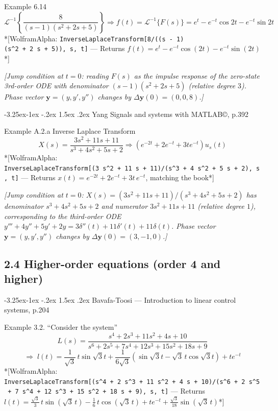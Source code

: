 \documentclass[
  11pt,
]{article}
\makeatletter
\providecommand{\implies}{\Longrightarrow}
\renewcommand\paragraph{\@startsection{paragraph}{4}{\z@}%
                                     {-3.25ex\@plus -1ex \@minus -.2ex}%
                                     {1.5ex \@plus .2ex}%
                                     {\normalfont\normalsize\bfseries}}
\makeatother
\begin{document}
Example 6.14 \[
\mathcal{L}^{-1} \left\{ \frac{8}{(s-1)(s^2+2s+5)} \right\} \implies f(t) = \mathcal{L}^{-1}\{F(s)\} = e^t - e^{-t} \cos 2t - e^{-t} \sin 2t
\] *{[}WolframAlpha:
\texttt{InverseLaplaceTransform{[}8/((s\ -\ 1)(s\^{}2\ +\ 2\ s\ +\ 5)),\ s,\ t{]}}
--- Returns \(f(t) = e^{t} - e^{-t}\cos(2t) - e^{-t}\sin(2t)\)*{]}

\emph{{[}Jump condition at \(t=0\): reading \(F(s)\) as the impulse
response of the zero-state 3rd-order ODE with denominator
\((s-1)(s^2+2s+5)\) (relative degree \(3\)). Phase vector
\(\mathbf y=(y,y',y'')\) changes by \(\Delta\mathbf y(0)=(0,0,8)\).{]}}

\hypertarget{yang-signals-and-systems-with-matlab-p.392-1}{%
\paragraph{Yang Signals and systems with MATLAB©,
p.392}\label{yang-signals-and-systems-with-matlab-p.392-1}}

Example A.2.a Inverse Laplace Transform
\[X(s) = \frac{3s^2 + 11s + 11}{s^3 + 4s^2 + 5s + 2}
\implies (e^{-2t} + 2e^{-t} + 3te^{-t})u_s(t)
\] *{[}WolframAlpha:
\texttt{InverseLaplaceTransform{[}(3\ s\^{}2\ +\ 11\ s\ +\ 11)/(s\^{}3\ +\ 4\ s\^{}2\ +\ 5\ s\ +\ 2),\ s,\ t{]}}
--- Returns \(x(t) = e^{-2t} + 2e^{-t} + 3t\,e^{-t}\), matching the
book*{]}

\emph{{[}Jump condition at \(t=0\):
\(X(s)=(3s^2+11s+11)/(s^3+4s^2+5s+2)\) has denominator \(s^3+4s^2+5s+2\)
and numerator \(3s^2+11s+11\) (relative degree \(1\)), corresponding to
the third-order ODE
\(y'''+4y''+5y'+2y=3\delta''(t)+11\delta'(t)+11\delta(t)\). Phase vector
\(\mathbf y=(y,y',y'')\) changes by \(\Delta\mathbf y(0)=(3,-1,0)\).{]}}

\hypertarget{higher-order-equations}{%
\subsection{2.4 Higher-order equations (order 4 and
higher)}\label{higher-order-equations}}

\hypertarget{bavafa-toosi-introduction-to-linear-control-systems-p.204}{%
\paragraph{Bavafa-Toosi --- Introduction to linear control systems,
p.204}\label{bavafa-toosi-introduction-to-linear-control-systems-p.204}}

Example 3.2. ``Consider the system'' \[
L(s) = \frac{s^4 + 2s^3 + 11s^2 + 4s + 10}{s^6 + 2s^5 + 7s^4 + 12s^3 + 15s^2 + 18s + 9}
\] \[
\implies\; l(t) = \frac{1}{\sqrt{3}}\,t\sin\sqrt{3}t + \frac{1}{6\sqrt{3}}\left(\sin\sqrt{3}t - \sqrt{3}\,t\cos\sqrt{3}t\right) + t e^{-t}
\] *{[}WolframAlpha:
\texttt{InverseLaplaceTransform{[}(s\^{}4\ +\ 2\ s\^{}3\ +\ 11\ s\^{}2\ +\ 4\ s\ +\ 10)/(s\^{}6\ +\ 2\ s\^{}5\ +\ 7\ s\^{}4\ +\ 12\ s\^{}3\ +\ 15\ s\^{}2\ +\ 18\ s\ +\ 9),\ s,\ t{]}}
--- Returns
\(l(t) = \frac{\sqrt3}{3}\,t\sin(\sqrt3\,t) - \frac16\,t\cos(\sqrt3\,t) + t e^{-t} + \frac{\sqrt3}{18}\sin(\sqrt3\,t)\)*{]}
\end{document}
